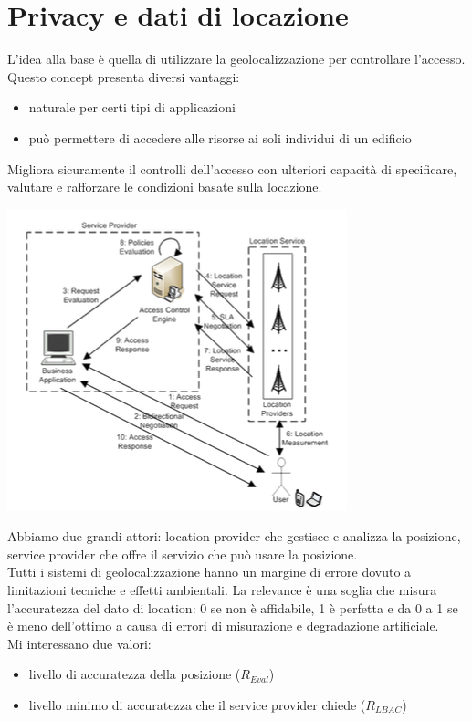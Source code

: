 \section{Privacy e dati di locazione}
L'idea alla base è quella di utilizzare la geolocalizzazione per controllare l'accesso. Questo concept presenta diversi vantaggi:
\begin{itemize}
    \item naturale per certi tipi di applicazioni
    \item può permettere di accedere alle risorse ai soli individui di un edificio
\end{itemize}
Migliora sicuramente il controlli dell'accesso con ulteriori capacità di specificare, valutare e rafforzare le condizioni basate sulla locazione.
\begin{center}
    \includegraphics[scale=0.5]{img/lbac.png}
\end{center}
Abbiamo due grandi attori: location provider che gestisce e analizza la posizione, service provider che offre il servizio che può usare la posizione.\\
Tutti i sistemi di geolocalizzazione hanno un margine di errore dovuto a limitazioni tecniche e effetti ambientali. La relevance è una soglia che misura l’accuratezza del dato di location: 0 se non è affidabile, 1 è perfetta e da 0 a 1 se è meno dell'ottimo a causa di errori di misurazione e degradazione artificiale. \\
Mi interessano due valori: 
\begin{itemize}
    \item livello di accuratezza della posizione (\(R_{Eval}\))
    \item livello minimo di accuratezza che il service provider chiede (\(R_{LBAC}\))
\end{itemize}
